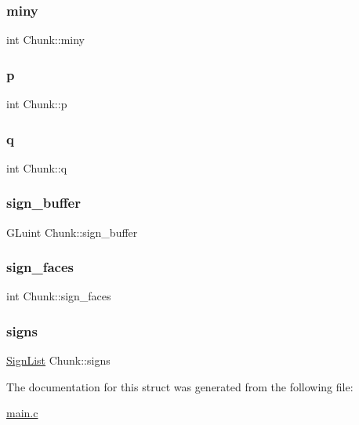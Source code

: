 \mbox{\label{structChunk_a528c51d2899b3f2d2c1fa8d7ef90621a}} 
\subsubsection{\texorpdfstring{miny}{miny}}
{\footnotesize\ttfamily int Chunk\+::miny}

\mbox{\label{structChunk_a016383084b50c856a1fb63f97ca63dc6}} 
\subsubsection{\texorpdfstring{p}{p}}
{\footnotesize\ttfamily int Chunk\+::p}

\mbox{\label{structChunk_a20fb30e8ac307726320ef6d3e4cd89a1}} 
\subsubsection{\texorpdfstring{q}{q}}
{\footnotesize\ttfamily int Chunk\+::q}

\mbox{\label{structChunk_a7c89d7fc29dbdd94c50280e92def013c}} 
\subsubsection{\texorpdfstring{sign\+\_\+buffer}{sign\_buffer}}
{\footnotesize\ttfamily G\+Luint Chunk\+::sign\+\_\+buffer}

\mbox{\label{structChunk_a6ffdf89c012dfaefe531aa0eb93fe69a}} 
\subsubsection{\texorpdfstring{sign\+\_\+faces}{sign\_faces}}
{\footnotesize\ttfamily int Chunk\+::sign\+\_\+faces}

\mbox{\label{structChunk_acd18dcf6bf17f499e36b5806519d8800}} 
\subsubsection{\texorpdfstring{signs}{signs}}
{\footnotesize\ttfamily \hyperlink{structSignList}{Sign\+List} Chunk\+::signs}



The documentation for this struct was generated from the following file\+:\begin{DoxyCompactItemize}
\item 
\hyperlink{main_8c}{main.\+c}\end{DoxyCompactItemize}
